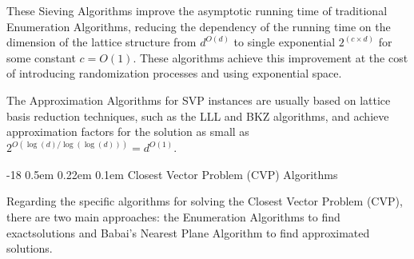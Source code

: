 \documentclass[runningheads]{llncs}
\makeatletter
\renewcommand\subsubsection{\@startsection{subsubsection}{3}{\z@}%
                       {-18\p@ \@plus -4\p@ \@minus -4\p@}%
                       {0.5em \@plus 0.22em \@minus 0.1em}%
                       {\normalfont\normalsize\bfseries\boldmath}}
\numberwithin{equation}{section}
\makeatother
\begin{document}
\begin{enumerate}
        These Sieving Algorithms improve the asymptotic running time of traditional Enumeration Algorithms, reducing the dependency of the running time on the dimension of the lattice structure from ${d}^{O(d)}$ to single exponential ${2}^{(c \times d)}$ for some constant $c = O(1)$. These algorithms achieve this improvement at the cost of introducing randomization processes and using exponential space.
        
    \end{enumerate}

    \vspace{2ex}
    
    \noindent The Approximation Algorithms for SVP instances are usually based on lattice basis reduction techniques, such as the LLL and BKZ algorithms, and achieve approximation factors for the solution as small as ${2}^{O(\log(d)/\log(\log(d)))} = {d}^{O(1)}$.
    
    \subsubsection{Closest Vector Problem (CVP) Algorithms}
    \label{subsubsec:closest-vector-problem-algorithms}
    
    Regarding the specific algorithms for solving the Closest Vector Problem (CVP), there are two main approaches: the Enumeration Algorithms to find exact\break solutions and Babai's Nearest Plane Algorithm to find approximated solutions.
\end{document}
